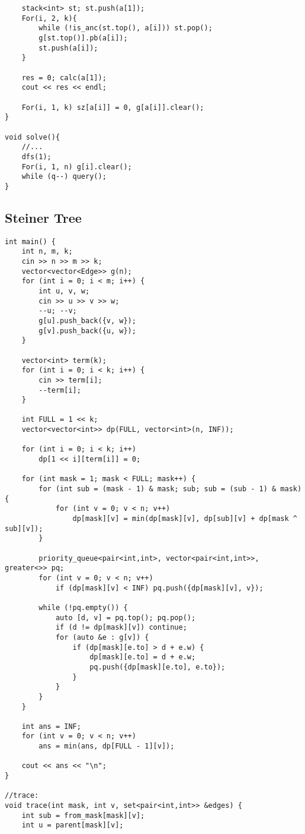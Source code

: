 \documentclass[11pt,a4paper]{article}
\begin{document}
\begin{multicols*}{2}
\begin{lstlisting}
	stack<int> st; st.push(a[1]);
	For(i, 2, k){
		while (!is_anc(st.top(), a[i])) st.pop();
		g[st.top()].pb(a[i]);
		st.push(a[i]);
	}
	
	res = 0; calc(a[1]);
	cout << res << endl;
	
	For(i, 1, k) sz[a[i]] = 0, g[a[i]].clear();
}

void solve(){
	//...	
	dfs(1);
	For(i, 1, n) g[i].clear();
	while (q--) query();
}
\end{lstlisting}

\subsection{Steiner Tree}
\begin{lstlisting}
int main() {
    int n, m, k;
    cin >> n >> m >> k;
    vector<vector<Edge>> g(n);
    for (int i = 0; i < m; i++) {
        int u, v, w;
        cin >> u >> v >> w;
        --u; --v;
        g[u].push_back({v, w});
        g[v].push_back({u, w});
    }

    vector<int> term(k);
    for (int i = 0; i < k; i++) {
        cin >> term[i];
        --term[i];
    }

    int FULL = 1 << k;
    vector<vector<int>> dp(FULL, vector<int>(n, INF));

    for (int i = 0; i < k; i++)
        dp[1 << i][term[i]] = 0;

    for (int mask = 1; mask < FULL; mask++) {
        for (int sub = (mask - 1) & mask; sub; sub = (sub - 1) & mask) {
            for (int v = 0; v < n; v++)
                dp[mask][v] = min(dp[mask][v], dp[sub][v] + dp[mask ^ sub][v]);
        }

        priority_queue<pair<int,int>, vector<pair<int,int>>, greater<>> pq;
        for (int v = 0; v < n; v++)
            if (dp[mask][v] < INF) pq.push({dp[mask][v], v});

        while (!pq.empty()) {
            auto [d, v] = pq.top(); pq.pop();
            if (d != dp[mask][v]) continue;
            for (auto &e : g[v]) {
                if (dp[mask][e.to] > d + e.w) {
                    dp[mask][e.to] = d + e.w;
                    pq.push({dp[mask][e.to], e.to});
                }
            }
        }
    }

    int ans = INF;
    for (int v = 0; v < n; v++)
        ans = min(ans, dp[FULL - 1][v]);

    cout << ans << "\n";
}

//trace:
void trace(int mask, int v, set<pair<int,int>> &edges) {
    int sub = from_mask[mask][v];
    int u = parent[mask][v];


\end{lstlisting}
\end{multicols*}
\end{document}
